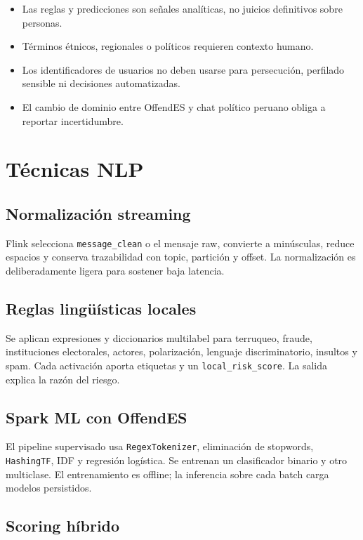 \documentclass[11pt,a4paper,openany]{report}
\newcommand{\topic}[1]{\texttt{#1}}
\begin{document}
\begin{itemize}
  \item Las reglas y predicciones son señales analíticas, no juicios definitivos sobre personas.
  \item Términos étnicos, regionales o políticos requieren contexto humano.
  \item Los identificadores de usuarios no deben usarse para persecución, perfilado sensible ni decisiones automatizadas.
  \item El cambio de dominio entre OffendES y chat político peruano obliga a reportar incertidumbre.
\end{itemize}

\chapter{Técnicas NLP}

\section{Normalización streaming}

Flink selecciona \topic{message\_clean} o el mensaje raw, convierte a minúsculas, reduce espacios y conserva trazabilidad con topic, partición y offset. La normalización es deliberadamente ligera para sostener baja latencia.

\section{Reglas lingüísticas locales}

Se aplican expresiones y diccionarios multilabel para terruqueo, fraude, instituciones electorales, actores, polarización, lenguaje discriminatorio, insultos y spam. Cada activación aporta etiquetas y un \topic{local\_risk\_score}. La salida explica la razón del riesgo.

\section{Spark ML con OffendES}

El pipeline supervisado usa \topic{RegexTokenizer}, eliminación de stopwords, \topic{HashingTF}, IDF y regresión logística. Se entrenan un clasificador binario y otro multiclase. El entrenamiento es offline; la inferencia sobre cada batch carga modelos persistidos.

\section{Scoring híbrido}
\end{document}
